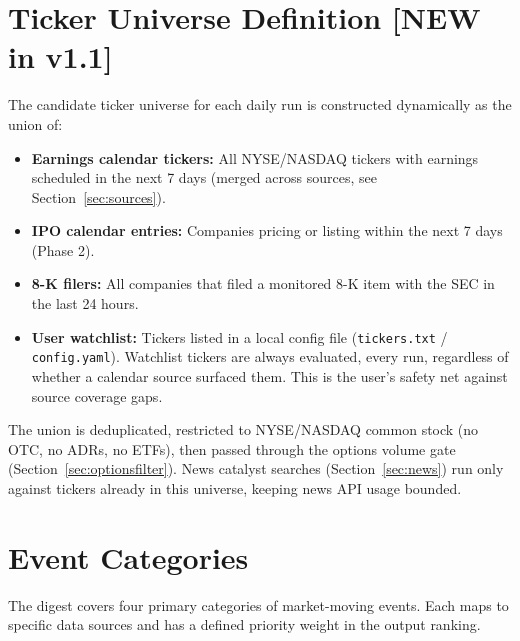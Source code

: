 \documentclass[11pt]{article}
\begin{document}
\section{Ticker Universe Definition \hfill {\small [NEW in v1.1]}}

The candidate ticker universe for each daily run is constructed dynamically as the union of:

\begin{itemize}
  \item \textbf{Earnings calendar tickers:} All NYSE/NASDAQ tickers with earnings scheduled in the next 7 days (merged across sources, see Section~\ref{sec:sources}).
  \item \textbf{IPO calendar entries:} Companies pricing or listing within the next 7 days (Phase 2).
  \item \textbf{8-K filers:} All companies that filed a monitored 8-K item with the SEC in the last 24 hours.
  \item \textbf{User watchlist:} Tickers listed in a local config file (\texttt{tickers.txt} / \texttt{config.yaml}). Watchlist tickers are always evaluated, every run, regardless of whether a calendar source surfaced them. This is the user's safety net against source coverage gaps.
\end{itemize}

The union is deduplicated, restricted to NYSE/NASDAQ common stock (no OTC, no ADRs, no ETFs), then passed through the options volume gate (Section~\ref{sec:optionsfilter}). News catalyst searches (Section~\ref{sec:news}) run only against tickers already in this universe, keeping news API usage bounded.

\section{Event Categories}

The digest covers four primary categories of market-moving events. Each maps to specific data sources and has a defined priority weight in the output ranking.
\end{document}
